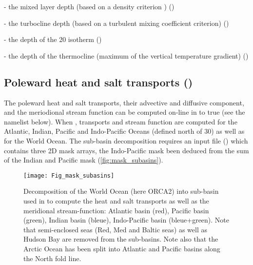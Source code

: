 \documentclass[../main/NEMO_manual]{subfiles}
\begin{document}
- the mixed layer depth (based on a density criterion \citep{de_Boyer_Montegut_al_JGR04}) ()

- the turbocline depth (based on a turbulent mixing coefficient criterion) ()

- the depth of the 20 isotherm ()

- the depth of the thermocline (maximum of the vertical temperature gradient) ()


\subsection{Poleward heat and salt transports (\protect{})}



The poleward heat and salt transports, their advective and diffusive component,
and the meriodional stream function can be computed on-line in   to true
(see the \textit{ } namelist below).
When , transports and stream function are computed for the Atlantic, Indian,
Pacific and Indo-Pacific Oceans (defined north of 30) as well as for the World Ocean.
The sub-basin decomposition requires an input file () which contains three 2D mask arrays,
the Indo-Pacific mask been deduced from the sum of the Indian and Pacific mask (\autoref{fig:mask_subasins}).

\begin{figure}[!t]
  \begin{center}
    \texttt{[image: Fig\_mask\_subasins]}
    \caption{
      \protect\label{fig:mask_subasins}
		Decomposition of the World Ocean (here ORCA2) into sub-basin used in to
      compute the heat and salt transports as well as the meridional stream-function:
      Atlantic basin (red), Pacific basin (green), Indian basin (bleue), Indo-Pacific basin (bleue+green).
		Note that semi-enclosed seas (Red, Med and Baltic seas) as well as Hudson Bay are removed from the sub-basins.
      Note also that the Arctic Ocean has been split into Atlantic and Pacific basins along the North fold line.
    }
  \end{center}
\end{figure}  
\end{document}
